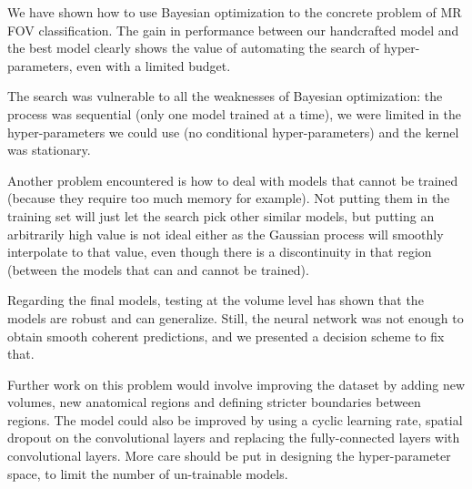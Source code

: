 We have shown how to use Bayesian optimization to the concrete problem of MR FOV classification. The gain in performance between our handcrafted model and the best model clearly shows the value of automating the search of hyper-parameters, even with a limited budget.

The search was vulnerable to all the weaknesses of Bayesian optimization: the process was sequential (only one model trained at a time), we were limited in the hyper-parameters we could use (no conditional hyper-parameters) and the kernel was stationary. 

Another problem encountered is how to deal with models that cannot be trained (because they require too much memory for example). Not putting them in the training set will just let the search pick other similar models, but putting an arbitrarily high value is not ideal either as the Gaussian process will smoothly interpolate to that value, even though there is a discontinuity in that region (between the models that can and cannot be trained).

Regarding the final models, testing at the volume level has shown that the models are robust and can generalize. Still, the neural network was not enough to obtain smooth coherent predictions, and we presented a decision scheme to fix that.

Further work on this problem would involve improving the dataset by adding new volumes, new anatomical regions and defining stricter boundaries between regions. The model could also be improved by using a cyclic learning rate, spatial dropout on the convolutional layers and replacing the fully-connected layers with convolutional layers. More care should be put in designing the hyper-parameter space, to limit the number of un-trainable models. 



